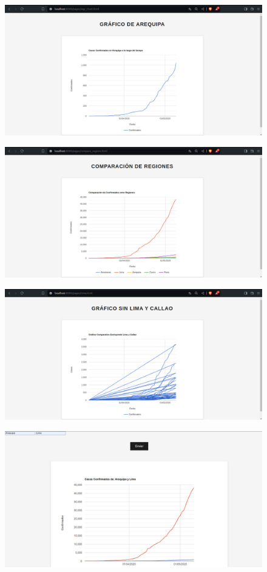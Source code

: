 \documentclass{article}
\begin{document}
\begin{figure}[h]
\centering
\includegraphics[width=0.75\linewidth]{latex//img/result5.png}
\caption{}
\label{fig:enter-label}
\end{figure}
\begin{figure}[h]
\centering
\includegraphics[width=0.75\linewidth]{latex//img/result6.png}
\caption{}
\label{fig:enter-label}
\end{figure}
\begin{figure}[h]
\centering
\includegraphics[width=0.75\linewidth]{latex//img/result7.png}
\caption{}
\label{fig:enter-label}
\end{figure}
\begin{figure}[h]
\centering
\includegraphics[width=0.75\linewidth]{latex/penultima.png}
\caption{}
\label{fig:enter-label}
\end{figure}
\end{document}
